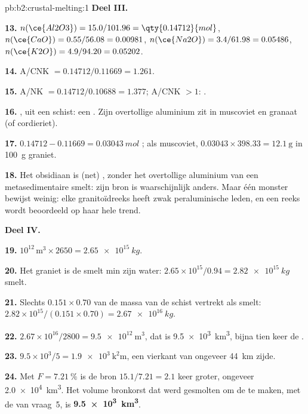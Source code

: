 \begin{solution}{pb:b2:crustal-melting:1}
\noindent\textbf{Deel III.}

\textbf{13.} $n(\ce{Al2O3}) = 15.0/101.96 = \qty{0.14712}{mol}$, $n(\ce{CaO}) =
0.55/56.08 = 0.00981$, $n(\ce{Na2O}) = 3.4/61.98 = 0.05486$, $n(\ce{K2O}) = 4.9/94.20 =
0.05202$.

\textbf{14.} A/CNK $= 0.14712/0.11669 = 1.261$.

\textbf{15.} A/NK $= 0.14712/0.10688 = 1.377$; A/CNK $> 1$: .

\textbf{16.} , uit een schist: een . Zijn overtollige aluminium zit in
muscoviet en granaat (of cordieriet).

\textbf{17.} $0.14712 - 0.11669 = \qty{0.03043}{mol}$ ; als muscoviet,
$0.03043\times398.33 = \qty{12.1}{\gram}$ in \qty{100}{\gram} graniet.

\textbf{18.} Het obsidiaan is (net) , zonder het overtollige aluminium van een
metasedimentaire smelt: zijn bron is waarschijnlijk anders. Maar één monster bewijst weinig:
elke granitoïdreeks heeft zwak peraluminische leden, en een reeks wordt beoordeeld op haar hele
trend.

\noindent\textbf{Deel IV.}

\textbf{19.} $10^{12}\,\unit{\cubic\metre}\times2650 = \qty{2.65e15}{kg}$.

\textbf{20.} Het graniet is de smelt min zijn water: $2.65\times10^{15}/0.94 =
\qty{2.82e15}{kg}$ smelt.

\textbf{21.} Slechts $0.151\times0.70$ van de massa van de schist vertrekt als smelt:
$2.82\times10^{15}/(0.151\times0.70) = \qty{2.67e16}{kg}$.

\textbf{22.} $2.67\times10^{16}/2800 = \qty{9.5e12}{\cubic\metre}$, dat is
\qty{9.5e3}{\cubic\kilo\metre}, bijna tien keer de .

\textbf{23.} $9.5\times10^3/5 = \qty{1.9e3}{\square\kilo\metre}$, een vierkant van ongeveer
\qty{44}{km} zijde.

\textbf{24.} Met $F = \qty{7.21}{\percent}$ is de bron $15.1/7.21 = 2.1$ keer
groter, ongeveer \qty{2.0e4}{\cubic\kilo\metre}. Het volume bronkorst dat werd gesmolten om
de  te maken, met de  van vraag~5, is
\textbf{\qty[text-series-to-math=true]{9.5e3}{\cubic\kilo\metre}}.
\end{solution}
